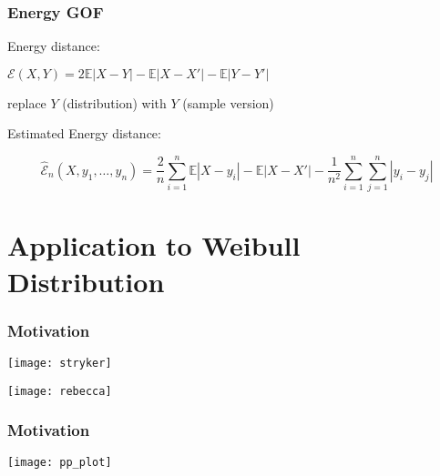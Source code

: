 \documentclass[presentation]{beamer}
\newenvironment{Figure}
{\par\medskip\noindent\minipage{\linewidth}}
{\endminipage\par\medskip}
\begin{document}
\begin{frame}
  \frametitle{Energy GOF}
  \begin{block}{Energy distance:}
    \begin{center}
      $\mathcal{E}(X,Y) = 2\mathbb{E}|X - Y| - \mathbb{E}|X - X'| -
      \mathbb{E}|Y - Y'|$
    \end{center}
  \end{block}
  replace $Y$ (distribution) with $Y$ (sample version)
  \begin{block}{Estimated Energy distance:}
    \begin{center}
      $$\hat{\mathcal{E}}_n(X, y_1, \ldots, y_n) = \frac{2}{n} \sum_{i=1}^n \mathbb{E}|X - y_i|  - \mathbb{E}|X - X'|  - \frac{1}{n^2} \sum_{i=1}^n \sum_{j=1}^n |y_i - y_j|$$
    \end{center}
  \end{block}  
\end{frame}

\section{Application to Weibull Distribution}

\begin{frame}
  \frametitle{Motivation}
  \begin{Figure}
    \centering
    \texttt{[image: stryker]}
  \end{Figure}
\end{frame}

\begin{frame}
  \texttt{[image: rebecca]}
\end{frame}

\begin{frame}
  \frametitle{Motivation}
  \begin{Figure}
    \centering
    \texttt{[image: pp\_plot]}
  \end{Figure}
\end{frame}
\end{document}
